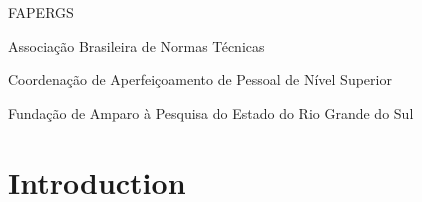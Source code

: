 \documentclass[twoside,brazilian,english]{UNISINOSmonografia}
\begin{document}
%
\begin{listadesiglas}{FAPERGS}
\item[ABNT] Associação Brasileira de Normas Técnicas
\item[CAPES] Coordenação de Aperfeiçoamento de Pessoal de Nível Superior
\item[FAPERGS] Fundação de Amparo à Pesquisa do Estado do Rio Grande do Sul
\end{listadesiglas}

%

\tableofcontents

\chapter{Introduction}
\end{document}

